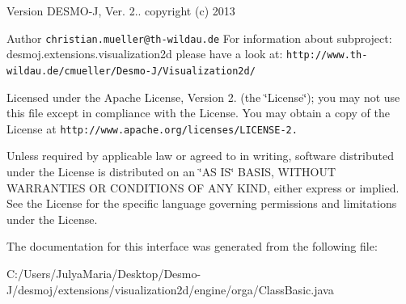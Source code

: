 \begin{DoxyVersion}{Version}
D\-E\-S\-M\-O-\/\-J, Ver. 2.. copyright (c) 2013 
\end{DoxyVersion}
\begin{DoxyAuthor}{Author}
{\tt christian.\-mueller@th-\/wildau.\-de} For information about subproject\-: desmoj.\-extensions.\-visualization2d please have a look at\-: {\tt http\-://www.\-th-\/wildau.\-de/cmueller/\-Desmo-\/\-J/\-Visualization2d/}
\end{DoxyAuthor}
Licensed under the Apache License, Version 2. (the \char`\"{}\-License\char`\"{}); you may not use this file except in compliance with the License. You may obtain a copy of the License at {\tt http\-://www.\-apache.\-org/licenses/\-L\-I\-C\-E\-N\-S\-E-\/2.}

Unless required by applicable law or agreed to in writing, software distributed under the License is distributed on an \char`\"{}\-A\-S I\-S\char`\"{} B\-A\-S\-I\-S, W\-I\-T\-H\-O\-U\-T W\-A\-R\-R\-A\-N\-T\-I\-E\-S O\-R C\-O\-N\-D\-I\-T\-I\-O\-N\-S O\-F A\-N\-Y K\-I\-N\-D, either express or implied. See the License for the specific language governing permissions and limitations under the License. 

The documentation for this interface was generated from the following file\-:\begin{DoxyCompactItemize}
\item 
C\-:/\-Users/\-Julya\-Maria/\-Desktop/\-Desmo-\/\-J/desmoj/extensions/visualization2d/engine/orga/Class\-Basic.\-java\end{DoxyCompactItemize}
